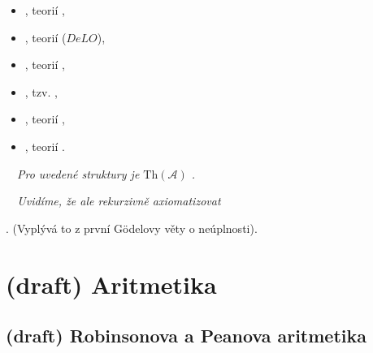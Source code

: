    \begin{itemize}
    \item {}, teorií ,
    \smallskip
    
    \item {}, teorií  ($DeLO$),
    \smallskip
    
    \item {}, teorií ,
    \smallskip
    
    \item {}, tzv. ,
    \smallskip
    
    \item {}, teorií ,
    \smallskip
    
    \item {}, teorií .
    \end{itemize}
    \medskip
    
    {\bf {}}\ \ {\it Pro uvedené struktury je $\mathrm{Th}(\mathcal{A})$ .}
    \medskip
    
    \smallskip
    
    {\it {}\ \ Uvidíme, že ale  rekurzivně axiomatizovat
    \smallskip
    
    . (Vyplývá to z první Gödelovy věty o neúplnosti).}
    



\section{(draft) Aritmetika}\todo



\subsection{(draft) Robinsonova a Peanova aritmetika}\todo

